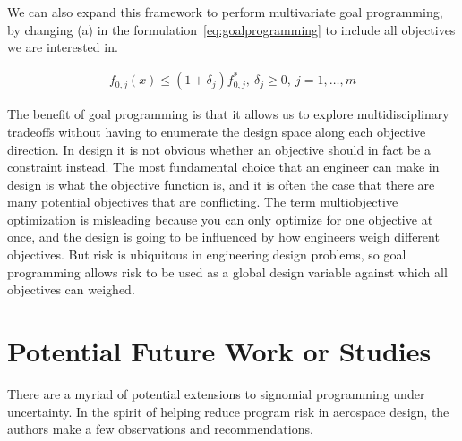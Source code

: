 
We can also expand this framework to perform multivariate goal programming,
by changing (a) in the formulation~\ref{eq:goalprogramming} to include all
objectives we are interested in.

\begin{align*}
    f_{0,j}(x) \leq (1+\delta_j) f^*_{0,j},~\delta_j \geq 0,~j = 1,\ldots, m
    \label{eq:multigoal}
\end{align*}

The benefit of goal programming is that it allows us to explore multidisciplinary tradeoffs without
having to enumerate the design space along each objective direction.
In design it is not obvious whether an objective should in fact be a constraint instead. The most
fundamental choice that an engineer can make in design is what the objective function is, and it is
often the case that there are many potential objectives that are conflicting.
The term multiobjective optimization is misleading
because you can only optimize for one objective at once,
and the design is going to be influenced by how engineers weigh different objectives.
But risk is ubiquitous in engineering design problems, so goal programming allows risk to be used as
a global design variable against which all objectives can weighed.

\section{Potential Future Work or Studies}

There are a myriad of potential extensions to signomial programming under uncertainty.
In the spirit of helping reduce program risk in aerospace design,
the authors make a few observations and recommendations.

